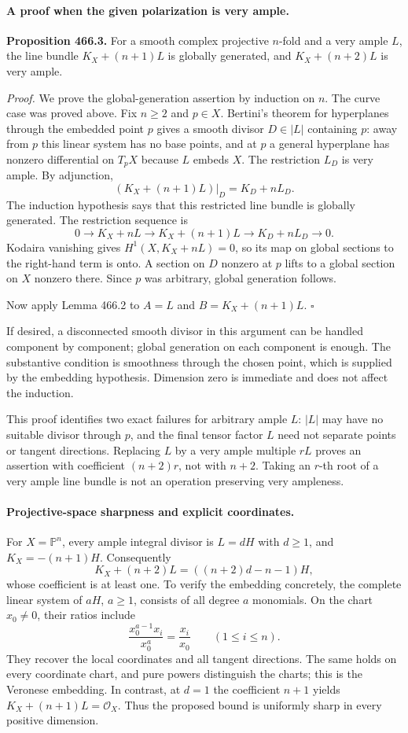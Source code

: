 \documentclass[11pt]{article}
\begin{document}
\paragraph{A proof when the given polarization is very ample.}
\textbf{Proposition 466.3.} For a smooth complex projective $n$-fold
and a very ample $L$, the line bundle $K_X+(n+1)L$ is globally
generated, and $K_X+(n+2)L$ is very ample.

\emph{Proof.}
We prove the global-generation assertion by induction on $n$.
The curve case was proved above. Fix $n\geq2$ and $p\in X$.
Bertini's theorem for hyperplanes through the embedded point $p$
gives a smooth divisor $D\in|L|$ containing $p$: away from $p$ this
linear system has no base points, and at $p$ a general hyperplane has
nonzero differential on $T_pX$ because $L$ embeds $X$.
The restriction $L_D$ is very ample. By adjunction,
\[
 (K_X+(n+1)L)|_D=K_D+nL_D.
\]
The induction hypothesis says that this restricted line bundle is
globally generated. The restriction sequence is
\[
 0\longrightarrow K_X+nL\longrightarrow K_X+(n+1)L
 \longrightarrow K_D+nL_D\longrightarrow0.
\]
Kodaira vanishing gives $H^1(X,K_X+nL)=0$, so its map on global
sections to the right-hand term is onto. A section on $D$ nonzero
at $p$ lifts to a global section on $X$ nonzero there. Since $p$
was arbitrary, global generation follows.

Now apply Lemma 466.2 to $A=L$ and $B=K_X+(n+1)L$.
\hfill$\square$

If desired, a disconnected smooth divisor in this argument can be
handled component by component; global generation on each component
is enough. The substantive condition is smoothness through the chosen
point, which is supplied by the embedding hypothesis. Dimension zero
is immediate and does not affect the induction.

This proof identifies two exact failures for arbitrary ample $L$:
$|L|$ may have no suitable divisor through $p$, and the final tensor
factor $L$ need not separate points or tangent directions. Replacing
$L$ by a very ample multiple $rL$ proves an assertion with coefficient
$(n+2)r$, not with $n+2$. Taking an $r$-th root of a very ample line
bundle is not an operation preserving very ampleness.

\paragraph{Projective-space sharpness and explicit coordinates.}
For $X=\mathbb P^n$, every ample integral divisor is $L=dH$ with
$d\geq1$, and $K_X=-(n+1)H$. Consequently
\[
 K_X+(n+2)L=((n+2)d-n-1)H,
\]
whose coefficient is at least one. To verify the embedding concretely,
the complete linear system of $aH$, $a\geq1$, consists of all degree
$a$ monomials. On the chart $x_0\ne0$, their ratios include
\[
 \frac{x_0^{a-1}x_i}{x_0^a}=\frac{x_i}{x_0}
 \qquad(1\leq i\leq n).
\]
They recover the local coordinates and all tangent directions. The same
holds on every coordinate chart, and pure powers distinguish the
charts; this is the Veronese embedding. In contrast, at $d=1$ the
coefficient $n+1$ yields $K_X+(n+1)L=\mathcal O_X$.
Thus the proposed bound is uniformly sharp in every positive dimension.
\end{document}
